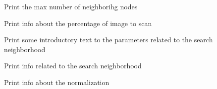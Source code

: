 \documentclass[letterpaper,10pt,english]{sphinxmanual}
\begin{document}
\begin{fulllineitems}
\begin{fulllineitems}
\end{fulllineitems}


\begin{fulllineitems}
\label{\detokenize{appendices:s2Dcd.deesse.Param.print_max_nod}}
Print the max number of neighborihg nodes

\end{fulllineitems}


\begin{fulllineitems}
\label{\detokenize{appendices:s2Dcd.deesse.Param.print_maxscan}}
Print info about the percentage of image to scan

\end{fulllineitems}


\begin{fulllineitems}
\label{\detokenize{appendices:s2Dcd.deesse.Param.print_neigh_intro}}
Print some introductory text to the 
parameters related to the search neighborhood

\end{fulllineitems}


\begin{fulllineitems}
\label{\detokenize{appendices:s2Dcd.deesse.Param.print_neighs}}
Print info related to the search neighborhood

\end{fulllineitems}


\begin{fulllineitems}
\label{\detokenize{appendices:s2Dcd.deesse.Param.print_norm}}
Print info about the normalization


\end{fulllineitems}
\end{fulllineitems}
\end{document}
